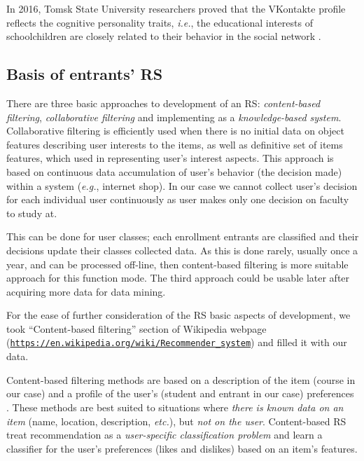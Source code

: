 \documentclass[conference,a4]{IEEEtran}
\begin{document}
In 2016, Tomsk State University researchers proved that the VKontakte profile reflects the cognitive personality traits, \emph{i.e.}, the educational interests of schoolchildren are closely related to their behavior in the social network \cite{c9}.


\subsection{Basis of entrants' RS}

There are three basic approaches to development of an RS: \emph{content-based filtering}, \emph{collaborative filtering} and implementing as a \emph{knowledge-based system}.  Collaborative filtering is efficiently used when there is no initial data on object features describing user interests to the items, as well as definitive set of items features, which used in representing user's interest aspects.  This approach is based on continuous data accumulation of user's behavior (the decision made) within a system (\emph{e.g.}, internet shop).  In our case we cannot collect user's decision for each individual user continuously as user makes only one decision on faculty to study at.

This can be done for user classes; each enrollment entrants are classified and their decisions update their classes collected data.  As this is done rarely, usually once a year, and can be processed off-line, then content-based filtering is more suitable approach for this function mode.  The third approach could be usable later after acquiring more data for data mining.


For the ease of further consideration of the RS basic aspects of development, we took ``Content-based filtering'' section of Wikipedia webpage (\texttt{\url{https://en.wikipedia.org/wiki/Recommender_system}}) and filled it with our data.

{%
Content-based filtering methods are based on a description of the item (course in our case) and a profile of the user's (student and entrant in our case) preferences \cite{wb41,wb42}. These methods are best suited to situations where \emph{there is known data on an item} (name, location, description, \emph{etc.}), but \emph{not on the user}. Content-based RS treat recommendation as a \emph{user-specific classification problem} and learn a classifier for the user's preferences (likes and dislikes) based on an item's features.}
\end{document}
